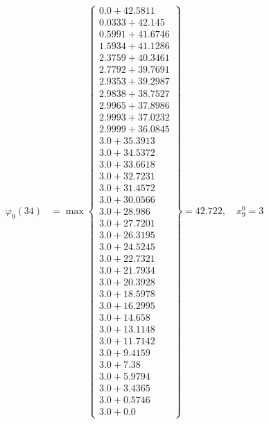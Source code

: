 \documentclass{article}
\begin{document}
\begin{align*}
  
\varphi_{9}(34) &= \max \left\{ \begin{array}{c}
0.0 + 42.5811 \\
 0.0333 + 42.145 \\
 0.5991 + 41.6746 \\
 1.5934 + 41.1286 \\
 2.3759 + 40.3461 \\
 2.7792 + 39.7691 \\
 2.9353 + 39.2987 \\
 2.9838 + 38.7527 \\
 2.9965 + 37.8986 \\
 2.9993 + 37.0232 \\
 2.9999 + 36.0845 \\
 3.0 + 35.3913 \\
 3.0 + 34.5372 \\
 3.0 + 33.6618 \\
 3.0 + 32.7231 \\
 3.0 + 31.4572 \\
 3.0 + 30.0566 \\
 3.0 + 28.986 \\
 3.0 + 27.7201 \\
 3.0 + 26.3195 \\
 3.0 + 24.5245 \\
 3.0 + 22.7321 \\
 3.0 + 21.7934 \\
 3.0 + 20.3928 \\
 3.0 + 18.5978 \\
 3.0 + 16.2995 \\
 3.0 + 14.658 \\
 3.0 + 13.1148 \\
 3.0 + 11.7142 \\
 3.0 + 9.4159 \\
 3.0 + 7.38 \\
 3.0 + 5.9794 \\
 3.0 + 3.4365 \\
 3.0 + 0.5746 \\
 3.0 + 0.0
\end{array} \right\}=42.722,\quad x_{9}^0=3\\
  
  
  

\end{align*}
\end{document}
